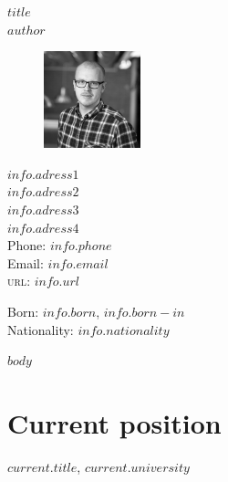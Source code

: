 \documentclass[11pt, a4paper]{article} %
\begin{document}

{\LARGE \em{$title$}}\\[0.5cm] %
{\LARGE $author$}\\[1cm] %

\begin{figure}
  \vspace{-16pt}
  \includegraphics[width=0.25\textwidth]{assets/profile_pic.png}
\end{figure}

$info.adress1$\\ %
$info.adress2$\\ %
$info.adress3$\\ %
$info.adress4$\\ %
[.2cm]
Phone: \texttt{$info.phone$}\\ %
Email: \href{mailto:#}{$info.email$}\\ %
\textsc{url}: \href{http://$info.url$}{$info.url$}\\ %


\vspace{40pt}


Born: $info.born$, $info.born-in$\\ %
Nationality: $info.nationality$ %


$body$

\vspace{20pt}


\section*{Current position}

\emph{$current.title$}, $current.university$ %
\end{document}
